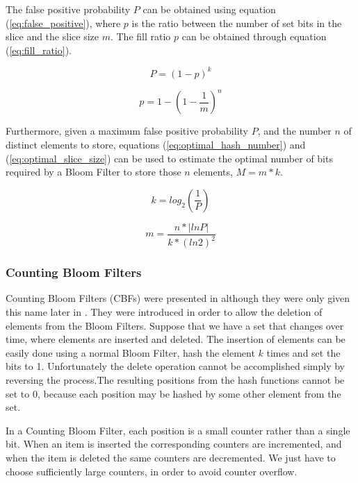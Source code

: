 The false positive probability $P$
can be obtained using equation (\ref{eq:false_positive}), where $p$ is
the ratio between the number of set bits in the slice and the slice
size $m$. The fill ratio $p$ can be obtained through equation
(\ref{eq:fill_ratio}).

\begin{equation}
  \label{eq:false_positive}
  P = (1-p)^k
\end{equation}

\begin{equation}
  \label{eq:fill_ratio}
  p = 1-(1-\frac{1}{m})^n
\end{equation}

Furthermore, given a maximum false positive probability $P$, and the
number $n$ of distinct elements to store, equations
(\ref{eq:optimal_hash_number}) and (\ref{eq:optimal_slice_size}) can
be used to estimate the optimal number of bits required by a Bloom
Filter to store those $n$ elements, $M=m*k$.

\begin{equation}
  \label{eq:optimal_hash_number}
  k = log_2(\frac{1}{P})
\end{equation}

\begin{equation}
  \label{eq:optimal_slice_size}
  m = \frac{n*|lnP|}{k*(ln2)^2}
\end{equation}

\subsubsection{Counting Bloom Filters}
\label{sec:count-bloom-filt}

Counting Bloom Filters (CBFs) were presented in
\cite{Fan98summarycache:} although they were only given this name
later in \cite{Mitzenmacher:2002:CBF:581876.581878}. They were
introduced in order to allow the deletion of elements from the Bloom
Filters. Suppose that we have a set that changes over time, where
elements are inserted and deleted. The insertion of elements can be
easily done using a normal Bloom Filter, hash the element $k$ times
and set the bits to 1. Unfortunately the delete operation cannot be
accomplished simply by reversing the process.The resulting positions
from the hash functions cannot be set to 0, because each position may
be hashed by some other element from the set.

In a Counting Bloom Filter, each position is a small counter rather
than a single bit. When an item is inserted the corresponding counters
are incremented, and when the item is deleted the same counters are
decremented. We just have to choose sufficiently large counters, in
order to avoid counter overflow.

